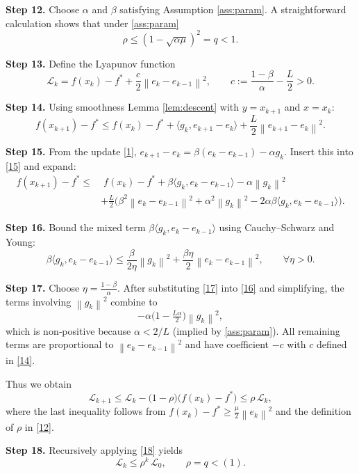 \documentclass{article}
\newcommand{\norm}[1]{\left\lVert #1 \right\rVert}
\newcommand{\ip}[2]{\langle #1,#2\rangle}
\begin{document}
\noindent\textbf{Step 12.}  Choose $\alpha$ and $\beta$ satisfying Assumption \ref{ass:param}.  
A straightforward calculation shows that under \eqref{ass:param}
\[
\rho\le (1-\sqrt{\alpha\mu})^{2}=q<1.
\tag{13}
\]

\noindent\textbf{Step 13.}  Define the Lyapunov function
\[
\mathcal{L}_{k}=f(x_{k})-f^{*}+\frac{c}{2}\norm{e_{k}-e_{k-1}}^{2},
\qquad
c:=\frac{1-\beta}{\alpha}-\frac{L}{2}>0.
\tag{14}
\]

\noindent\textbf{Step 14.}  Using smoothness Lemma \ref{lem:descent} with $y=x_{k+1}$ and $x=x_{k}$:
\[
f(x_{k+1})-f^{*}\le f(x_{k})-f^{*}
+\ip{g_{k}}{e_{k+1}-e_{k}}+\frac{L}{2}\norm{e_{k+1}-e_{k}}^{2}.
\tag{15}
\]

\noindent\textbf{Step 15.}  From the update \eqref{1},
$e_{k+1}-e_{k}= \beta(e_{k}-e_{k-1})-\alpha g_{k}$.
Insert this into \eqref{15} and expand:
\[
\begin{aligned}
f(x_{k+1})-f^{*}\le &\; f(x_{k})-f^{*}
+\beta\ip{g_{k}}{e_{k}-e_{k-1}}
-\alpha\norm{g_{k}}^{2}\\
&+\frac{L}{2}\bigl(\beta^{2}\norm{e_{k}-e_{k-1}}^{2}
+\alpha^{2}\norm{g_{k}}^{2}-2\alpha\beta\ip{g_{k}}{e_{k}-e_{k-1}}\bigr).
\end{aligned}
\tag{16}
\]

\noindent\textbf{Step 16.}  Bound the mixed term $ \beta\ip{g_{k}}{e_{k}-e_{k-1}}$ using Cauchy–Schwarz and Young:
\[
\beta\ip{g_{k}}{e_{k}-e_{k-1}}
\le \frac{\beta}{2\eta}\norm{g_{k}}^{2}+\frac{\beta\eta}{2}\norm{e_{k}-e_{k-1}}^{2},
\qquad \forall\eta>0.
\tag{17}
\]

\noindent\textbf{Step 17.}  Choose $\eta=\frac{1-\beta}{\alpha}$.
After substituting \eqref{17} into \eqref{16} and simplifying, the terms involving $\norm{g_{k}}^{2}$ combine to
\[
-\alpha\bigl(1-\tfrac{L\alpha}{2}\bigr)\norm{g_{k}}^{2},
\]
which is non‑positive because $\alpha<2/L$ (implied by \eqref{ass:param}).  
All remaining terms are proportional to $\norm{e_{k}-e_{k-1}}^{2}$ and have coefficient $-c$ with $c$ defined in \eqref{14}.

Thus we obtain
\[
\mathcal{L}_{k+1}\le \mathcal{L}_{k}-\bigl(1-\rho\bigr)\bigl(f(x_{k})-f^{*}\bigr)
\le \rho\,\mathcal{L}_{k},
\tag{18}
\]
where the last inequality follows from $f(x_{k})-f^{*}\ge \frac{\mu}{2}\norm{e_{k}}^{2}$ and the definition of $\rho$ in \eqref{12}.

\noindent\textbf{Step 18.}  Recursively applying \eqref{18} yields
\[
\mathcal{L}_{k}\le \rho^{k}\,\mathcal{L}_{0},
\qquad \rho=q<(1).
\tag{19}
\]
\end{document}
